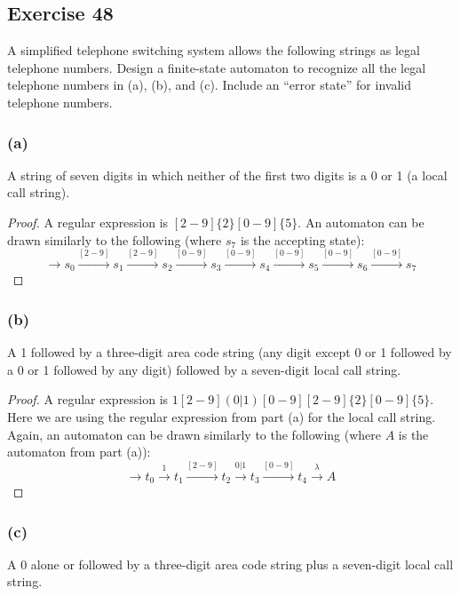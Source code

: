 \documentclass[14pt]{extarticle}
\begin{document}
\subsection{Exercise 48}
A simplified telephone switching system allows the following strings as legal telephone numbers. Design a finite-state
automaton to recognize all the legal telephone numbers in (a), (b), and (c). Include an “error state” for invalid telephone
numbers.

\subsubsection{(a)}
A string of seven digits in which neither of the first two digits is a 0 or 1 (a local call string).

\begin{proof}
    A regular expression is \([2-9]\{2\}[0-9]\{5\}\). An automaton can be drawn similarly to the following (where \(s_7\) is the
    accepting state):
    \[
        \to s_0 \overset{[2-9]}{\to} s_1 \overset{[2-9]}{\to} s_2 \overset{[0-9]}{\to} s_3 \overset{[0-9]}{\to} s_4
        \overset{[0-9]}{\to} s_5 \overset{[0-9]}{\to} s_6 \overset{[0-9]}{\to} s_7
    \]
\end{proof}

\subsubsection{(b)}
A 1 followed by a three-digit area code string (any digit except 0 or 1 followed by a 0 or 1 followed by any digit)
followed by a seven-digit local call string.

\begin{proof}
    A regular expression is \(1[2-9](0|1)[0-9][2-9]\{2\}[0-9]\{5\}\). Here we are using the regular expression from part (a) for
    the local call string. Again, an automaton can be drawn similarly to the following (where \(A\) is the automaton from
    part (a)):
    \[
        \to t_0 \overset{1}{\to} t_1 \overset{[2-9]}{\to} t_2 \overset{0|1}{\to} t_3 \overset{[0-9]}{\to} t_4
        \overset{\lambda}{\to} A
    \]
\end{proof}

\subsubsection{(c)}
A 0 alone or followed by a three-digit area code string plus a seven-digit local call string.
\end{document}
